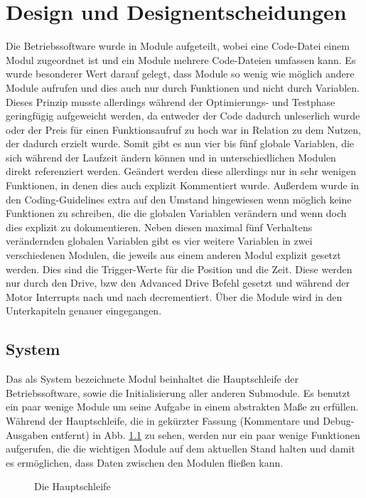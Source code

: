 \chapter{Design und Designentscheidungen}
Die Betriebssoftware wurde in Module aufgeteilt, wobei eine Code-Datei einem
Modul zugeordnet ist und ein Module mehrere Code-Dateien umfassen kann.
Es wurde besonderer Wert darauf gelegt, dass Module so wenig wie möglich andere
Module aufrufen und dies auch nur durch Funktionen und nicht durch Variablen.
Dieses Prinzip musste allerdings während der Optimierungs- und Testphase
geringfügig aufgeweicht werden, da entweder der Code dadurch unleserlich wurde
oder der Preis für einen Funktionsaufruf zu hoch war in Relation zu dem
Nutzen, der dadurch erzielt wurde.
Somit gibt es nun vier bis fünf globale Variablen, die sich während der Laufzeit
ändern können und in unterschiedlichen Modulen direkt referenziert werden.
Geändert werden diese allerdings nur in sehr wenigen Funktionen, in denen dies
auch explizit Kommentiert wurde. Außerdem wurde in den Coding-Guidelines extra
auf den Umstand hingewiesen wenn möglich keine Funktionen zu schreiben, die die
globalen Variablen verändern und wenn doch dies explizit zu dokumentieren.
Neben diesen maximal fünf Verhaltens verändernden globalen Variablen gibt es vier
weitere Variablen in zwei verschiedenen Modulen, die jeweils aus einem anderen
Modul explizit gesetzt werden. Dies sind die Trigger-Werte für die Position und
die Zeit. Diese werden nur durch den Drive, bzw den Advanced Drive Befehl
gesetzt und während der Motor Interrupts nach und nach decrementiert.
Über die Module wird in den Unterkapiteln genauer eingegangen.
\section{System}
Das als System bezeichnete Modul beinhaltet die Hauptschleife der Betriebssoftware,
sowie die Initialisierung aller anderen Submodule. Es benutzt ein paar wenige Module
um seine Aufgabe in einem abstrakten Maße zu erfüllen. Während der Hauptschleife, die
in gekürzter Fassung (Kommentare und Debug-Ausgaben entfernt) in Abb. \ref{main_loop} zu sehen,
werden nur ein paar wenige Funktionen aufgerufen, die die wichtigen Module auf dem
aktuellen Stand halten und damit es ermöglichen, dass Daten zwischen den Modulen
fließen kann.
\begin{figure}[htb]
 \centering
 \caption{\label{main_loop}Die Hauptschleife}
\end{figure}
